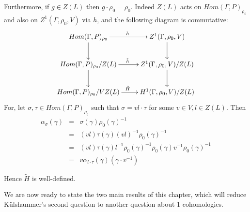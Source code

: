 Furthermore, if $g\in Z(L)$ then $g\cdot\rho_0 = \rho_0$. Indeed $Z(L)$ acts on $Hom(\Gamma, P)_{\rho_0}$ and also on $Z^1(\Gamma, \rho_0, V)$ via $h$, and the following diagram is commutative:
\begin{displaymath}
	\xymatrix{
		Hom(\Gamma, P)_{\rho_0} \ar[r]^{h} \ar[d] & Z^1(\Gamma, \rho_0, V) \ar[d] \\
		Hom(\Gamma, P)_{\rho_0}/Z(L) \ar[r]^{\tilde{h}} \ar[d] & Z^1(\Gamma, \rho_0, V)/Z(L) \ar[d] \\
		Hom(\Gamma, P)_{\rho_0}/VZ(L) \ar[r]^{\tilde{H}} & H^1(\Gamma, \rho_0, V)/Z(L)
	}
\end{displaymath}
For, let $\sigma,\tau\in Hom(\Gamma, P)_{\rho_0}$ such that $\sigma = vl\cdot\tau$ for some $v \in V,l\in Z(L)$. Then
\begin{eqnarray*}
  \alpha_\sigma(\gamma) &=&  \sigma(\gamma)\rho_0(\gamma)^{-1} \\
  &=& (vl)\tau(\gamma)(vl)^{-1}\rho_0(\gamma)^{-1} \\
  &=& (vl)\tau(\gamma)l^{-1}\rho_0(\gamma)^{-1}\rho_0(\gamma)v^{-1}\rho_0(\gamma)^{-1} \\
  &=& v\alpha_{l\cdot\tau}(\gamma)(\gamma\cdot v^{-1}) 
\end{eqnarray*}

Hence $\tilde{H}$ is well-defined. 

We are now ready to state the two main results of this chapter, which will reduce K\"ulshammer's second question to another question about 1-cohomologies.

